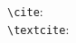\documentclass[varwidth=2in,border=5pt]{standalone}
\begin{document}
\verb|\cite|: \cite{gaonkar:in}\\
\verb|\textcite|: \textcite{gaonkar:in}
\end{document}

